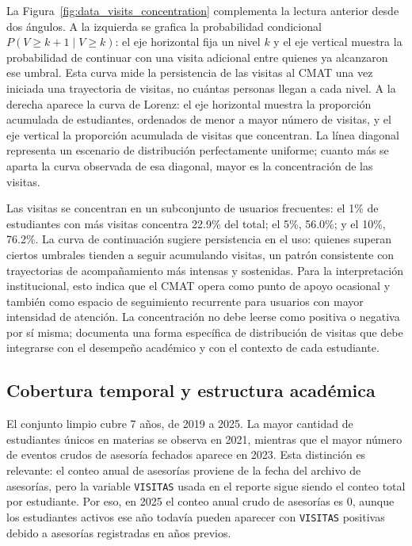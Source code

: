 \documentclass[10pt,letterpaper]{article} %
\numberwithin{figure}{subsection}
\begin{document}
La Figura~\ref{fig:data_visits_concentration} complementa la lectura anterior desde dos ángulos. A la izquierda se grafica la probabilidad condicional $P(V \geq k+1 \mid V \geq k)$: el eje horizontal fija un nivel $k$ y el eje vertical muestra la probabilidad de continuar con una visita adicional entre quienes ya alcanzaron ese umbral. Esta curva mide la persistencia de las visitas al CMAT una vez iniciada una trayectoria de visitas, no cuántas personas llegan a cada nivel. A la derecha aparece la curva de Lorenz: el eje horizontal muestra la proporción acumulada de estudiantes, ordenados de menor a mayor número de visitas, y el eje vertical la proporción acumulada de visitas que concentran. La línea diagonal representa un escenario de distribución perfectamente uniforme; cuanto más se aparta la curva observada de esa diagonal, mayor es la concentración de las visitas.

Las visitas se concentran en un subconjunto de usuarios frecuentes: el 1\% de estudiantes con más visitas concentra 22.9\% del total; el 5\%, 56.0\%; y el 10\%, 76.2\%. La curva de continuación sugiere persistencia en el uso: quienes superan ciertos umbrales tienden a seguir acumulando visitas, un patrón consistente con trayectorias de acompañamiento más intensas y sostenidas. Para la interpretación institucional, esto indica que el CMAT opera como punto de apoyo ocasional y también como espacio de seguimiento recurrente para usuarios con mayor intensidad de atención. La concentración no debe leerse como positiva o negativa por sí misma; documenta una forma específica de distribución de visitas que debe integrarse con el desempeño académico y con el contexto de cada estudiante.

\begin{table}[!htbp]
    \centering
    \caption{Indicadores de concentración y dispersión estructural de las visitas.}
    \label{tab:data_concentration}
    
\end{table}

\newpage
\subsection{Cobertura temporal y estructura académica}
El conjunto limpio cubre 7 años, de 2019 a 2025. La mayor cantidad de estudiantes únicos en materias se observa en 2021, mientras que el mayor número de eventos crudos de asesoría fechados aparece en 2023. Esta distinción es relevante: el conteo anual de asesorías proviene de la fecha del archivo de asesorías, pero la variable \texttt{VISITAS} usada en el reporte sigue siendo el conteo total por estudiante. Por eso, en 2025 el conteo anual crudo de asesorías es 0, aunque los estudiantes activos ese año todavía pueden aparecer con \texttt{VISITAS} positivas debido a asesorías registradas en años previos.
\end{document}
